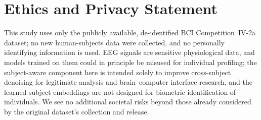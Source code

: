 \documentclass[acmsmall,screen,review]{acmart}
\begin{document}
\section*{Ethics and Privacy Statement}
This study uses only the publicly available, de-identified BCI Competition~IV-2a
dataset; no new human-subjects data were collected, and no personally
identifying information is used. EEG signals are sensitive physiological data,
and models trained on them could in principle be misused for individual
profiling; the subject-aware component here is intended solely to improve
cross-subject denoising for legitimate analysis and brain--computer interface
research, and the learned subject embeddings are not designed for biometric
identification of individuals. We see no additional societal risks beyond those
already considered by the original dataset's collection and release.


\clearpage


\clearpage

\end{document}
